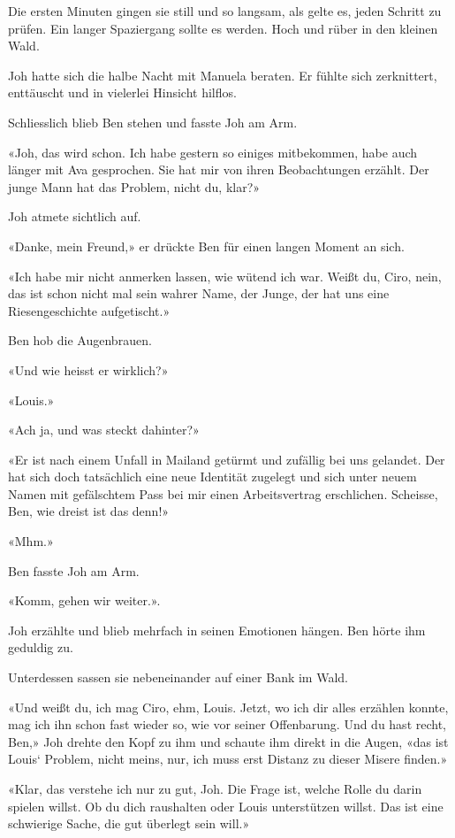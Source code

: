 Die ersten Minuten gingen sie still und so langsam, als gelte es, jeden
Schritt zu prüfen. Ein langer Spaziergang sollte es werden. Hoch und
rüber in den kleinen Wald.

Joh hatte sich die halbe Nacht mit Manuela beraten. Er fühlte sich
zerknittert, enttäuscht und in vielerlei Hinsicht hilflos.

Schliesslich blieb Ben stehen und fasste Joh am Arm.

«Joh, das wird schon. Ich habe gestern so einiges mitbekommen, habe auch
länger mit Ava gesprochen. Sie hat mir von ihren Beobachtungen erzählt.
Der junge Mann hat das Problem, nicht du, klar?»

Joh atmete sichtlich auf.

«Danke, mein Freund,» er drückte Ben für einen langen Moment an sich.

«Ich habe mir nicht anmerken lassen, wie wütend ich war. Weißt du, Ciro,
nein, das ist schon nicht mal sein wahrer Name, der Junge, der hat uns
eine Riesengeschichte aufgetischt.»

Ben hob die Augenbrauen.

«Und wie heisst er wirklich?»

«Louis.»

«Ach ja, und was steckt dahinter?»

«Er ist nach einem Unfall in Mailand getürmt und zufällig bei uns
gelandet. Der hat sich doch tatsächlich eine neue Identität zugelegt und
sich unter neuem Namen mit gefälschtem Pass bei mir einen Arbeitsvertrag
erschlichen. Scheisse, Ben, wie dreist ist das denn!»

«Mhm.»

Ben fasste Joh am Arm.

«Komm, gehen wir weiter.».

Joh erzählte und blieb mehrfach in seinen Emotionen hängen. Ben hörte
ihm geduldig zu.

Unterdessen sassen sie nebeneinander auf einer Bank im Wald.

«Und weißt du, ich mag Ciro, ehm, Louis. Jetzt, wo ich dir alles
erzählen konnte, mag ich ihn schon fast wieder so, wie vor seiner
Offenbarung. Und du hast recht, Ben,» Joh drehte den Kopf zu ihm und
schaute ihm direkt in die Augen, «das ist Louis` Problem, nicht meins,
nur, ich muss erst Distanz zu dieser Misere finden.»

«Klar, das verstehe ich nur zu gut, Joh. Die Frage ist, welche Rolle du
darin spielen willst. Ob du dich raushalten oder Louis unterstützen
willst. Das ist eine schwierige Sache, die gut überlegt sein will.»

